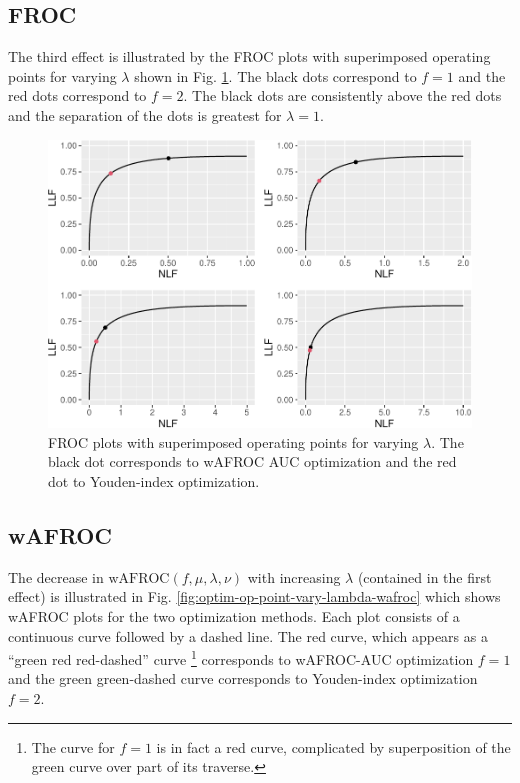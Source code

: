 \documentclass[
]{book}
\begin{document}
\hypertarget{froc-1}{%
\subsection{FROC}\label{froc-1}}

The third effect is illustrated by the FROC plots with superimposed operating points for varying \(\lambda\) shown in Fig. \ref{fig:optim-op-point-vary-lambda-froc}. The black dots correspond to \(f = 1\) and the red dots correspond to \(f = 2\). The black dots are consistently above the red dots and the separation of the dots is greatest for \(\lambda = 1\).

\begin{figure}
\centering
\includegraphics{21-optim-op-point_files/figure-latex/optim-op-point-vary-lambda-froc-1.pdf}
\caption{\label{fig:optim-op-point-vary-lambda-froc}FROC plots with superimposed operating points for varying \(\lambda\). The black dot corresponds to wAFROC AUC optimization and the red dot to Youden-index optimization.}
\end{figure}

\hypertarget{wafroc-1}{%
\subsection{wAFROC}\label{wafroc-1}}

The decrease in \(\text{wAFROC} \left ( f, \mu, \lambda, \nu \right )\) with increasing \(\lambda\) (contained in the first effect) is illustrated in Fig. \ref{fig:optim-op-point-vary-lambda-wafroc} which shows wAFROC plots for the two optimization methods. Each plot consists of a continuous curve followed by a dashed line. The red curve, which appears as a ``green red red-dashed'' curve \footnote{The curve for \(f = 1\) is in fact a red curve, complicated by superposition of the green curve over part of its traverse.} corresponds to wAFROC-AUC optimization \(f = 1\) and the green green-dashed curve corresponds to Youden-index optimization \(f = 2\).
\end{document}
